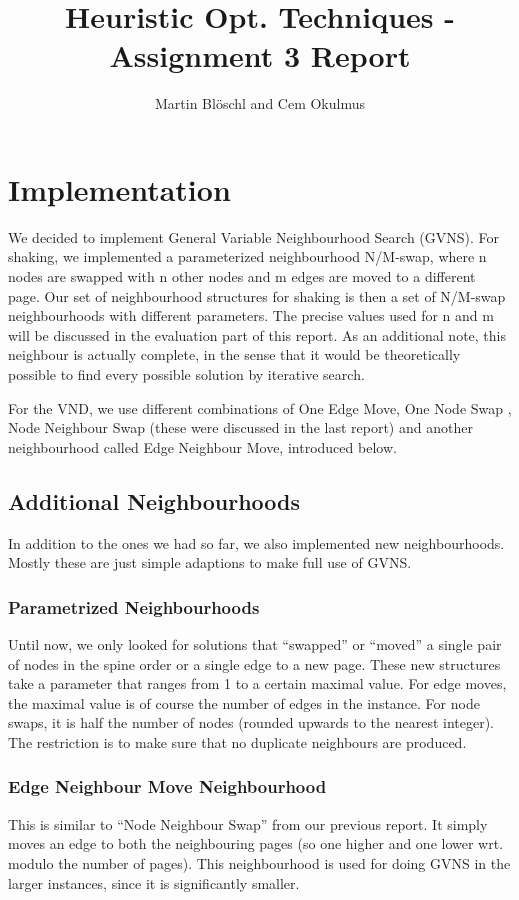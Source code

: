 \documentclass [11pt]{article}
\begin{document}
\title{ Heuristic Opt. Techniques - Assignment 3 Report}
\author{ Martin Blöschl and Cem Okulmus }

\maketitle
\thispagestyle{empty}


\section{Implementation}
We decided to implement General Variable Neighbourhood Search (GVNS). For shaking, we implemented a parameterized neighbourhood N/M-swap, where n nodes are swapped with n other nodes and m edges are moved to a different page. Our set of neighbourhood structures for shaking is then a set of N/M-swap neighbourhoods with different parameters. The precise values used for n and m will be discussed in the evaluation part of this report. As an additional note, this neighbour is actually complete, in the sense that it would be theoretically possible to find every possible solution by iterative search. 

For the VND, we use different combinations of One Edge Move, One Node Swap , Node Neighbour Swap (these were discussed in the last report) and another neighbourhood called Edge Neighbour Move, introduced below.

\subsection{Additional Neighbourhoods}
In addition to the ones we had so far, we also implemented new neighbourhoods. Mostly these are just simple adaptions to make full use of GVNS. 

\subsubsection{Parametrized Neighbourhoods}
Until now, we only looked for solutions that ``swapped'' or ``moved'' a single pair of nodes in the spine order or a single edge to a new page. These new structures take a parameter that ranges from 1 to a certain maximal value. For edge moves, the maximal value is of course the number of edges in the instance. For node swaps, it is half the number of nodes (rounded upwards to the nearest integer). The restriction is to make sure that no duplicate neighbours are produced.  

\subsubsection{Edge Neighbour Move Neighbourhood}
This is similar to ``Node Neighbour Swap'' from our previous report. It simply moves an edge to both the neighbouring pages (so one higher and one lower wrt. modulo the number of pages). This neighbourhood is used for doing GVNS in the larger instances, since it is significantly smaller. 
\end{document}
